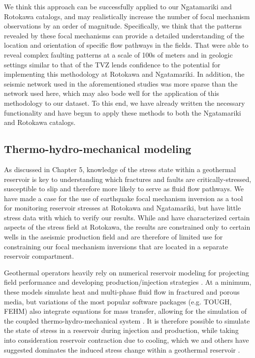 We think this approach can be successfully applied to our Ngatamariki and Rotokawa catalogs, and may realistically increase the number of focal mechanism observations by an order of magnitude. Specifically, we think that the patterns revealed by these focal mechanisms can provide a detailed understanding of the location and orientation of specific flow pathways in the fields. That \citet{Shelly_2016b,Hotovec_Ellis_2018,shelly2018illuminating} were able to reveal complex faulting patterns at a scale of 100s of meters and in geologic settings similar to that of the \acrshort{TVZ} lends confidence to the potential for implementing this methodology at Rotokawa and Ngatamariki. In addition, the seismic network used in the aforementioned studies was more sparse than the network used here, which may also bode well for the application of this methodology to our dataset. To this end, we have already written the necessary functionality and have begun to apply these methods to both the Ngatamariki and Rotokawa catalogs.  

\subsection{Thermo-hydro-mechanical modeling}
As discussed in Chapter 5, knowledge of the stress state within a geothermal reservoir is key to understanding which fractures and faults are critically-stressed, susceptible to slip and therefore more likely to serve as fluid flow pathways. We have made a case for the use of earthquake focal mechanism inversion as a tool for monitoring reservoir stresses at Rotokawa and Ngatamariki, but have little stress data with which to verify our results. While \citet{davidson_2012} and \citet{McNamara_2015} have characterized certain aspects of the stress field at Rotokawa, the results are constrained only to certain wells in the aseismic production field and are therefore of limited use for constraining our focal mechanism inversions that are located in a separate reservoir compartment.

Geothermal operators heavily rely on numerical reservoir modeling for projecting field performance and developing production\slash{injection} strategies \citep{Grant_2011,DiPippo_2016}. At a minimum, these models simulate heat and multi-phase fluid flow in fractured and porous media, but variations of the most popular software packages (e.g. TOUGH, FEHM) also integrate equations for mass transfer, allowing for the simulation of the coupled thermo-hydro-mechanical system \citep{zyvoloski2007fehm,jung2017tough3}. It is therefore possible to simulate the state of stress in a reservoir during injection and production, while taking into consideration reservoir contraction due to cooling, which we and others have suggested dominates the induced stress change within a geothermal reservoir \citep{stephens1982hydraulic,Jeanne_2014,Mart_nez_Garz_n_2013,Mart_nez_Garz_n_2014,Jeanne_2015tensor,Jeanne_2015deformation}.


